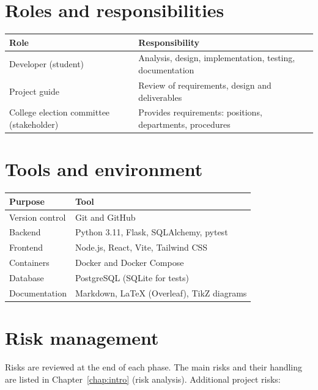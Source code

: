 \section{Roles and responsibilities}

\begin{center}
\begin{tabularx}{\linewidth}{@{}lX@{}}
\toprule
\textbf{Role} & \textbf{Responsibility} \\
\midrule
Developer (student) & Analysis, design, implementation, testing, documentation \\
Project guide & Review of requirements, design and deliverables \\
College election committee (stakeholder) & Provides requirements: positions, departments, procedures \\
\bottomrule
\end{tabularx}
\end{center}

\section{Tools and environment}

\begin{center}
\begin{tabularx}{\linewidth}{@{}lX@{}}
\toprule
\textbf{Purpose} & \textbf{Tool} \\
\midrule
Version control & Git and GitHub \\
Backend & Python 3.11, Flask, SQLAlchemy, pytest \\
Frontend & Node.js, React, Vite, Tailwind CSS \\
Containers & Docker and Docker Compose \\
Database & PostgreSQL (SQLite for tests) \\
Documentation & Markdown, \LaTeX{} (Overleaf), TikZ diagrams \\
\bottomrule
\end{tabularx}
\end{center}

\section{Risk management}

Risks are reviewed at the end of each phase. The main risks and their handling are listed in Chapter~\ref{chap:intro} (risk analysis). Additional project risks:

